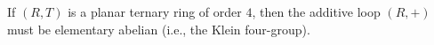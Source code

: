 If $(R, T)$ is a planar ternary ring of order $4$, then the additive loop $(R, +)$ must be elementary abelian (i.e., the Klein four-group).
